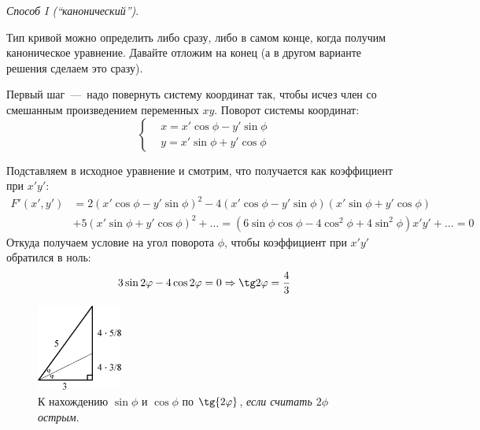 \documentclass[a4paper,12pt]{article}
\begin{document}
  \begin{solution}
    \vphantom{}
  
    \emph{Способ I (``канонический'')}.
    
    Тип кривой можно определить либо сразу, либо в самом конце, когда получим каноническое уравнение.
    Давайте отложим на конец (а в другом варианте решения сделаем это сразу).
    
    Первый шаг~---~надо повернуть систему координат так, чтобы исчез член со смешанным произведением переменных $xy$.
    Поворот системы координат:
    \[
      \left\{
        \begin{aligned}
          &x = x' \cos \phi - y' \sin \phi\\
          &y = x' \sin \phi + y' \cos \phi
        \end{aligned}
      \right.
    \]
    
    Подставляем в исходное уравнение и смотрим, что получается как коэффициент при $x'y'$:
    \begin{equation*}
    \begin{split}
      F'(x', y') &= 2 (x' \cos \phi - y' \sin \phi)^2 - 4 (x' \cos \phi - y' \sin \phi) (x' \sin \phi + y' \cos \phi)\\
      &+ 5 (x' \sin \phi + y' \cos \phi)^2 + \ldots
      = (6 \sin\phi \cos\phi - 4 \cos^2 \phi + 4\sin^2 \phi)x' y' + \ldots = 0
    \end{split}
    \end{equation*}
    Откуда получаем условие на угол поворота $\phi$, чтобы коэффициент при $x'y'$ обратился в ноль:
    \[
       3 \sin 2\phi - 4 \cos 2\phi = 0 \Rightarrow \tg 2\phi = \frac{4}{3}
    \]
    
    \begin{figure}[h]
      \centering

      \includegraphics[width=0.25\textwidth]{triangle-9-4}
    
      \caption{К нахождению $\sin\phi$ и $\cos\phi$ по $\tg{2\phi}$, \emph{если считать $2\phi$ острым}.}
      \label{fig:triangle-9-4}
    \end{figure}
    

\end{solution}
\end{document}
